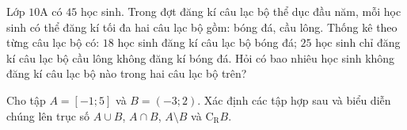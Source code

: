 \begin{ex}%
Lớp $10$A có $45$ học sinh. Trong đợt đăng kí câu lạc bộ thể dục đầu năm, mỗi học sinh có thể đăng kí tối đa hai câu lạc bộ gồm: bóng đá, cầu lông. Thống kê theo từng câu lạc bộ có: $18$ học sinh đăng kí câu lạc bộ bóng đá; $25$ học sinh chỉ đăng kí câu lạc bộ cầu lông không đăng kí bóng đá. Hỏi có bao nhiêu học sinh không đăng kí câu lạc bộ nào trong hai câu lạc bộ trên?
\end{ex}
\TL
\begin{ex}%
Cho tập $A=[-1 ; 5]$ và $B=(-3 ; 2)$. Xác định các tập hợp sau và biểu diễn chúng lên trục số $A \cup B$, $A \cap B$, $A \setminus B$ và $\mathrm{C}_{\mathrm{R}} B$.
\loigiai{
\begin{itemize}
\item $A \cup B=(-3;5]$.
\item $A \cap B=[-1;2)$.
\item $A \setminus B=[2;5]$.
\item $\mathrm{C}_{\mathrm{R}} B=(-\infty;-3]\cup [2;+\infty)$.
\end{itemize}
}
\end{ex}

